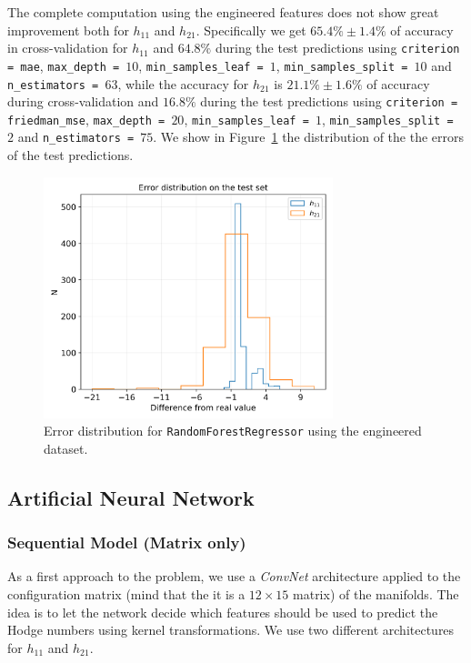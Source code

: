     The complete computation using the engineered features does not show great improvement both for $h_{11}$ and $h_{21}$. Specifically we get $65.4\% \pm 1.4\%$ of accuracy in cross-validation for $h_{11}$ and $64.8\%$ during the test predictions using \texttt{criterion = mae}, \texttt{max\_depth = $10$}, \texttt{min\_samples\_leaf = $1$}, \texttt{min\_samples\_split = $10$} and \texttt{n\_estimators = $63$}, while the accuracy for $h_{21}$ is $21.1\% \pm 1.6\%$ of accuracy during cross-validation and $16.8\%$ during the test predictions using \texttt{criterion = friedman\_mse}, \texttt{max\_depth = $20$}, \texttt{min\_samples\_leaf = $1$}, \texttt{min\_samples\_split = $2$} and \texttt{n\_estimators = $75$}. We show in Figure~\ref{fig:rnd_for_err} the distribution of the the errors of the test predictions.
    
    \begin{figure}[t]
        \centering
        \includegraphics[width=0.75\textwidth]{tex/img/rnd_for_error_eng.png}
        \caption{Error distribution for \texttt{RandomForestRegressor} using the engineered dataset.}
        \label{fig:rnd_for_err}
    \end{figure}
    
\subsection{Artificial Neural Network}

    \subsubsection{Sequential Model (Matrix only)}
        As a first approach to the problem, we use a \textit{ConvNet} architecture applied to the configuration matrix (mind that the it is a $12 \times 15$ matrix) of the manifolds. The idea is to let the network decide which features should be used to predict the Hodge numbers using kernel transformations. We use two different architectures for $h_{11}$ and $h_{21}$.
        
